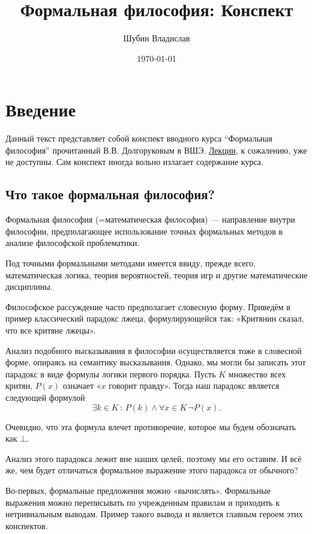 \documentclass[openany]{book}
\date{\today}
\author{Шубин Владислав}
\title{Формальная философия: Конспект}
\theoremstyle{plain}
\theoremstyle{definition}
\begin{document}
\maketitle
\tableofcontents

\chapter{Введение}

Данный текст представляет собой конспект вводного курса ``Формальная философия'' прочитанный В.В. Долгоруковым в ВШЭ. \href{https://drive.google.com/drive/folders/14R_Xut-3dRLUAvHlE7vkMyW9hsI8oiwV}{Лекции}, к сожалению, уже не доступны. Сам конспект иногда вольно излагает содержание курса.

\section{ Что такое формальная философия? }

Формальная философия (=математическая философия) — направление внутри философии, предполагающее использование точных формальных методов в анализе философской проблематики.

Под точными формальными методами имеется ввиду, прежде всего, математическая логика, теория вероятностей, теория игр и другие математические дисциплины.

Философское рассуждение часто предполагает словесную форму. Приведём в пример классический парадокс лжеца, формулирующейся так:
«Критянин сказал, что все критяне лжецы».

Анализ подобного высказывания в философии осуществляется тоже в словесной форме, опираясь на семантику высказывания. Однако, мы могли бы записать этот парадокс в виде формулы логики первого порядка. Пусть $K$ множество всех критян, \(P(x)\) означает «\(x\) говорит правду». Тогда наш парадокс является следующей формулой \[\exists k \in K \, : \, P(k) \land \forall x \in K \, \neg P(x).\]

\noindent Очевидно, что эта формула влечет противоречие, которое мы будем обозначать как $\bot$.

Анализ этого парадокса лежит вне наших целей, поэтому мы его оставим. И всё же, чем будет отличаться формальное выражение этого парадокса от обычного?

Во-первых, формальные предложения можно «вычислять». Формальные выражения можно переписывать по учрежденным правилам и приходить к нетривиальным выводам. Пример такого вывода и является главным героем этих конспектов.
\end{document}
